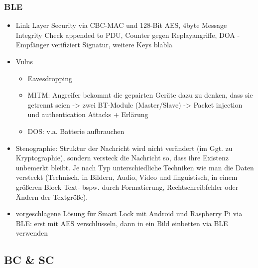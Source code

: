     \subsubsection*{BLE}
        \begin{itemize}
            \item Link Layer Security via CBC-MAC und 128-Bit AES, 4byte Message Integrity Check appended to PDU, Counter gegen Replayangriffe, DOA - Empfänger verifiziert Signatur, weitere Keys blabla
            \item Vulns
                \begin{itemize}
                    \item Eavesdropping
                    \item MITM: Angreifer bekommt die gepairten Geräte dazu zu denken, dass sie getrennt seien -> zwei BT-Module (Master/Slave) -> Packet injection und authentication Attacks + Erlärung
                    \item DOS: v.a. Batterie aufbrauchen
                \end{itemize}
            \item Stenographie: Struktur der Nachricht wird nicht verändert (im Ggt. zu Kryptographie), sondern versteck die Nachricht so, dass ihre Existenz unbemerkt bleibt. Je nach Typ unterschiedliche Techniken wie man die Daten versteckt (Technisch, in Bildern, Audio, Video und linguistisch, in einem größeren Block Text- bspw. durch Formatierung, Rechtschreibfehler oder Ändern der Textgröße).
            \item vorgeschlagene Lösung für Smart Lock mit Android und Raspberry Pi via BLE: erst mit AES verschlüsseln, dann in ein Bild einbetten via BLE verwenden
        \end{itemize}

\subsection*{BC \& SC}\cite{Christidis2016} 
